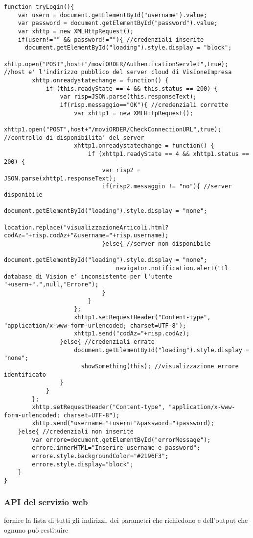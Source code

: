 \begin{lstlisting}[tabsize=2]
function tryLogin(){
	var usern = document.getElementById("username").value;
	var password = document.getElementById("password").value;
	var xhttp = new XMLHttpRequest();
	if(usern!="" && password!=""){ //credenziali inserite
	  document.getElementById("loading").style.display = "block";
		xhttp.open("POST",host+"/moviORDER/AuthenticationServlet",true); //host e' l'indirizzo pubblico del server cloud di VisioneImpresa
		xhttp.onreadystatechange = function() {
			if (this.readyState == 4 && this.status == 200) {
				var risp=JSON.parse(this.responseText);
				if(risp.messaggio=="OK"){ //credenziali corrette
				    var xhttp1 = new XMLHttpRequest();
				    xhttp1.open("POST",host+"/moviORDER/CheckConnectionURL",true); //controllo di disponibilita' del server
				    xhttp1.onreadystatechange = function() {
				        if (xhttp1.readyState == 4 && xhttp1.status == 200) {
				            var risp2 = JSON.parse(xhttp1.responseText);
				            if(risp2.messaggio != "no"){ //server disponibile
				                document.getElementById("loading").style.display = "none";
				                location.replace("visualizzazioneArticoli.html?codAz="+risp.codAz+"&username="+risp.username);
				            }else{ //server non disponibile
				                document.getElementById("loading").style.display = "none";
				                navigator.notification.alert("Il database di Vision e' inconsistente per l'utente "+usern+".",null,"Errore");
				            }
				        }
				    };
				    xhttp1.setRequestHeader("Content-type", "application/x-www-form-urlencoded; charset=UTF-8");
                    xhttp1.send("codAz="+risp.codAz);
				}else{ //credenziali errate
				    document.getElementById("loading").style.display = "none";
					  showSomething(this); //visualizzazione errore identificato
				}
			}
		};
		xhttp.setRequestHeader("Content-type", "application/x-www-form-urlencoded; charset=UTF-8");
		xhttp.send("username="+usern+"&password="+password);
	}else{ //credenziali non inserite
		var errore=document.getElementById("errorMessage");
		errore.innerHTML="Inserire username e password";
		errore.style.backgroundColor="#2196F3";
		errore.style.display="block";
	}
}
\end{lstlisting}



\subsubsection{API del servizio web}
fornire la lista di tutti gli indirizzi, dei parametri che richiedono e dell'output che ognuno può restituire

